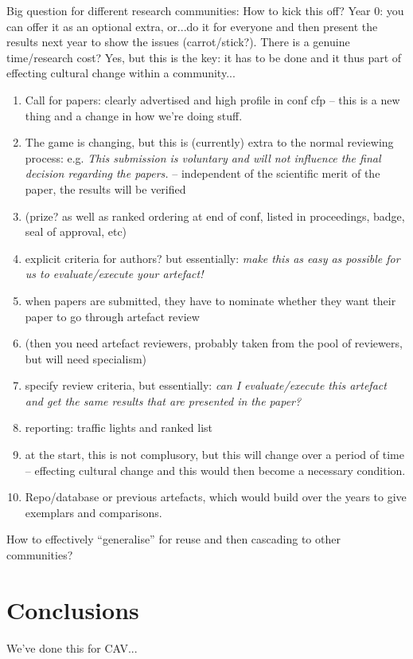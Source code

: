 \documentclass{llncs}
\begin{document}
Big question for different research communities: How to kick this off?
Year 0: you can offer it as an optional extra, or...do it for everyone
and then present the results next year to show the issues
(carrot/stick?). There is a genuine time/research cost? Yes, but this
is the key: it has to be done and it thus part of effecting cultural
change within a community...

\begin{enumerate}
\item Call for papers: clearly advertised and high profile in conf cfp
  -- this is a new thing and a change in how we're doing stuff.
\item The game is changing, but this is (currently) extra to the
  normal reviewing process: 
e.g. {\emph{This submission is voluntary and will not influence the final decision
regarding the papers.}} -- independent of the scientific merit of the
paper, the results will be verified 
\item (prize? as well as ranked ordering at end of conf, listed in
  proceedings, badge, seal of approval, etc)
\item explicit criteria for authors? but essentially: {\emph{make this
      as easy as possible for us to evaluate/execute your artefact!}}
\item when papers are submitted, they have to nominate whether they
  want their paper to go through artefact review
\item (then you need artefact reviewers, probably taken from the pool of
  reviewers, but will need specialism)
\item specify review criteria, but essentially: {\emph{can I evaluate/execute this
  artefact and get the same results that are presented in the paper?}}
\item reporting: traffic lights and ranked list
\item at the start, this is not complusory, but this will change over a period of
time -- effecting cultural change and this would then become a
necessary condition.
\item Repo/database or previous artefacts, which would build over the
  years to give exemplars and comparisons.
\end{enumerate}

How to effectively ``generalise'' for reuse and then cascading to other communities?

\section{Conclusions}\label{concl}
We've done this for CAV...





\end{document}
